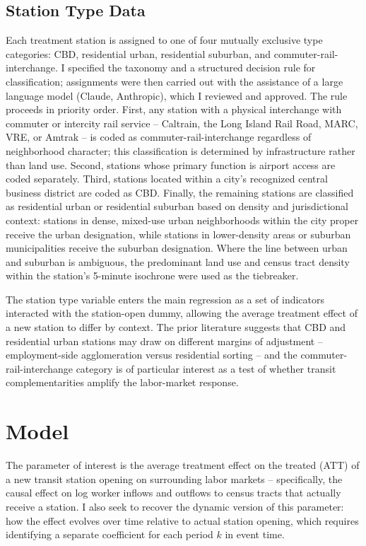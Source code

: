 \documentclass[12pt]{article}
\begin{document}
\subsection{Station Type Data}
Each treatment station is assigned to one of four mutually exclusive type categories: CBD, residential urban, residential suburban, and commuter-rail-interchange. I specified the taxonomy and a structured decision rule for classification; assignments were then carried out with the assistance of a large language model (Claude, Anthropic), which I reviewed and approved. The rule proceeds in priority order. First, any station with a physical interchange with commuter or intercity rail service -- Caltrain, the Long Island Rail Road, MARC, VRE, or Amtrak -- is coded as commuter-rail-interchange regardless of neighborhood character; this classification is determined by infrastructure rather than land use. Second, stations whose primary function is airport access are coded separately. Third, stations located within a city's recognized central business district are coded as CBD. Finally, the remaining stations are classified as residential urban or residential suburban based on density and jurisdictional context: stations in dense, mixed-use urban neighborhoods within the city proper receive the urban designation, while stations in lower-density areas or suburban municipalities receive the suburban designation. Where the line between urban and suburban is ambiguous, the predominant land use and census tract density within the station's 5-minute isochrone were used as the tiebreaker.
 
The station type variable enters the main regression as a set of indicators interacted with the station-open dummy, allowing the average treatment effect of a new station to differ by context. The prior literature suggests that CBD and residential urban stations may draw on different margins of adjustment -- employment-side agglomeration versus residential sorting -- and the commuter-rail-interchange category is of particular interest as a test of whether transit complementarities amplify the labor-market response.

\section{Model}\label{sec:design}
The parameter of interest is the average treatment effect on the treated (ATT) of a new transit station opening on surrounding labor markets  --  specifically, the causal effect on log worker inflows and outflows to census tracts that actually receive a station. I also seek to recover the dynamic version of this parameter: how the effect evolves over time relative to actual station opening, which requires identifying a separate coefficient for each period $k$ in event time.
\end{document}
